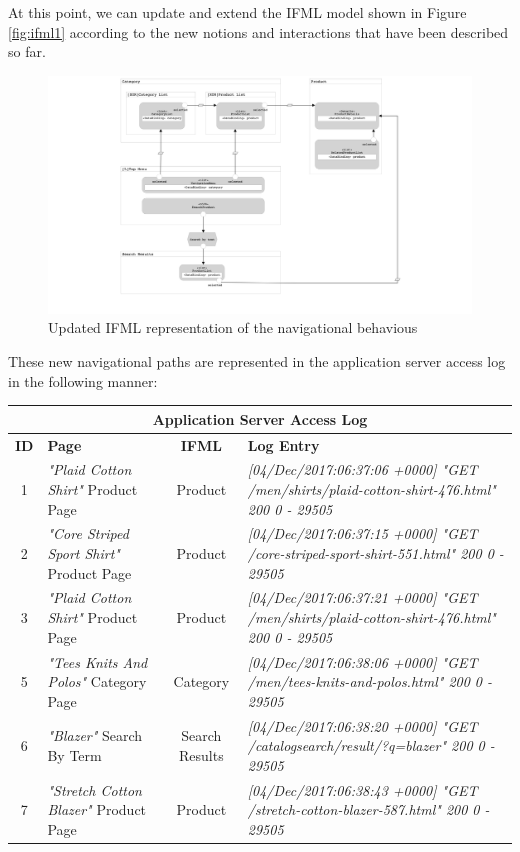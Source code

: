 At this point, we can update and extend the IFML model shown in Figure \ref{fig:ifml1} according to the new notions and interactions that have been described so far.

\vspace{0.5cm}
\begin{figure}[H]
  \centering
    \includegraphics[width=16cm]{images/madison/ifml2.png}
  \caption{Updated IFML representation of the navigational behavious}
  \label{fig:ifml2}
\end{figure}
\vspace{0.5cm}

These new navigational paths are represented in the application server access log in the following manner: 

\vspace{0.5cm}
\begin{center}
  \begin{tabular}{|c|p{3cm}|c|p{6cm}|}
  \hline
  \multicolumn{4}{|c|}{Application Server Access Log}\\ \hline
  \textbf{ID}&\textbf{Page}&\textbf{IFML}&\textbf{Log Entry}   \\ \hline
  1&\textit{"Plaid Cotton Shirt"} Product Page&Product&\em[04/Dec/2017:06:37:06 +0000] 
  "GET /men/shirts/plaid-cotton-shirt-476.html" 200 0 - 29505
  \\ \hline
  2&\textit{"Core Striped Sport Shirt"} Product Page &Product&\em [04/Dec/2017:06:37:15 +0000] "GET /core-striped-sport-shirt-551.html" 200 0 - 29505
  \\ \hline
  3&\textit{"Plaid Cotton Shirt"} Product Page &Product&\em[04/Dec/2017:06:37:21 +0000] "GET /men/shirts/plaid-cotton-shirt-476.html" 200 0 - 29505
  \\ \hline
  5&\textit{"Tees Knits And Polos"} Category Page &Category&\em[04/Dec/2017:06:38:06 +0000] "GET /men/tees-knits-and-polos.html" 200 0 - 29505
  \\ \hline
  6&\textit{"Blazer"} Search By Term&Search Results&\em[04/Dec/2017:06:38:20 +0000] "GET /catalogsearch/result/?q=blazer" 200 0 - 29505
  \\ \hline
  7&\textit{"Stretch Cotton Blazer"} Product Page &Product&\em[04/Dec/2017:06:38:43 +0000] "GET /stretch-cotton-blazer-587.html" 200 0 - 29505
  \\ \hline
  \end{tabular}
  \end{center}
\vspace{0.5cm}

